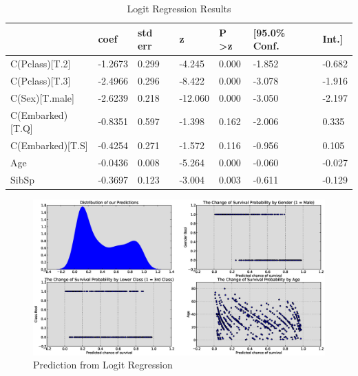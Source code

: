 \documentclass{article}
\begin{document}
\begin{table}[h]
  \caption{Logit Regression Results}
\begin{tabular}{| l | l | l | l | l | l | l |}
  \hline
   & coef & std err & z & P \textgreater z & [95.0\% Conf. & Int.] \\
   \hline
C(Pclass)[T.2]    &  -1.2673    &  0.299   &  -4.245    &  0.000     &   -1.852  &  -0.682 \\
  \hline
C(Pclass)[T.3]    &  -2.4966    &  0.296   &  -8.422    &  0.000     &   -3.078  &  -1.916 \\
  \hline
C(Sex)[T.male]    &  -2.6239    &  0.218   & -12.060    &  0.000     &   -3.050  &  -2.197 \\
  \hline
C(Embarked)[T.Q]  &  -0.8351    &  0.597   &  -1.398    &  0.162     &   -2.006  &   0.335 \\
  \hline
C(Embarked)[T.S]  &  -0.4254    &  0.271   &  -1.572    &  0.116     &   -0.956  &   0.105 \\
  \hline
Age               &  -0.0436    &  0.008   &  -5.264    &  0.000     &   -0.060  &  -0.027 \\
  \hline
SibSp             &  -0.3697    &  0.123   &  -3.004    &  0.003     &   -0.611  &  -0.129 \\
  \hline

\end{tabular}
\label {tab:logit}
\end{table}





\begin{figure}[h]
\begin{flushleft}
\hspace*{-1.2in}
\includegraphics[scale=0.4]{eps/prediction.eps} %
\caption{Prediction from Logit Regression}
\label {fig:pre}
\end{flushleft}
\end{figure}
\end{document}
